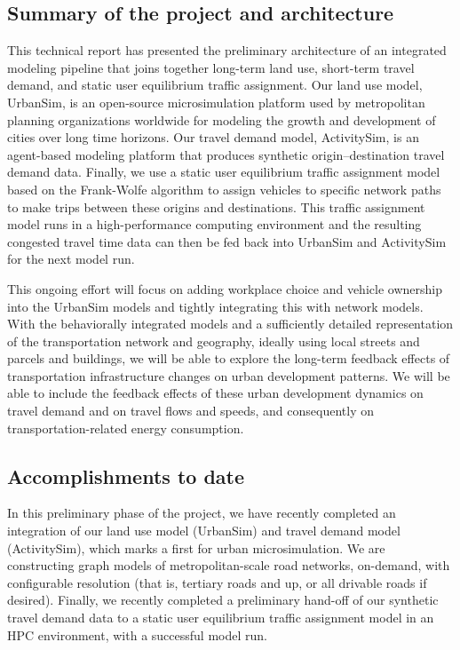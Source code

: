 \subsection{Summary of the project and architecture}

This technical report has presented the preliminary architecture of an integrated modeling pipeline that joins together long-term land use, short-term travel demand, and static user equilibrium traffic assignment. Our land use model, UrbanSim, is an open-source microsimulation platform used by metropolitan planning organizations worldwide for modeling the growth and development of cities over long time horizons. Our travel demand model, ActivitySim, is an agent-based modeling platform that produces synthetic origin--destination travel demand data. Finally, we use a static user equilibrium traffic assignment model based on the Frank-Wolfe algorithm to assign vehicles to specific network paths to make trips between these origins and destinations. This traffic assignment model runs in a high-performance computing environment and the resulting congested travel time data can then be fed back into UrbanSim and ActivitySim for the next model run. 

This ongoing effort will focus on adding workplace choice and vehicle ownership into the UrbanSim models and tightly integrating this with network models. With the behaviorally integrated models and a sufficiently detailed representation of the transportation network and geography, ideally using local streets and parcels and buildings, we will be able to explore the long-term feedback effects of transportation infrastructure changes on urban development patterns. We will be able to include the feedback effects of these urban development dynamics on travel demand and on travel flows and speeds, and consequently on transportation-related energy consumption.

\subsection{Accomplishments to date}

In this preliminary phase of the project, we have recently completed an integration of our land use model (UrbanSim) and travel demand model (ActivitySim), which marks a first for urban microsimulation. We are constructing graph models of metropolitan-scale road networks, on-demand, with configurable resolution (that is, tertiary roads and up, or all drivable roads if desired). Finally, we recently completed a preliminary hand-off of our synthetic travel demand data to a static user equilibrium traffic assignment model in an HPC environment, with a successful model run.

